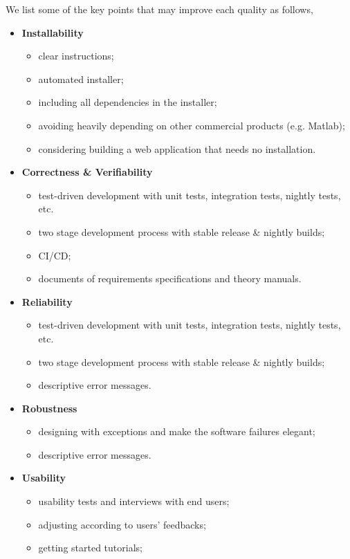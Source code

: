 We list some of the key points that may improve each quality as follows,
\begin{itemize}
\item \textbf{Installability}
\begin{itemize}
    \item clear instructions;
    \item automated installer;
    \item including all dependencies in the installer;
    \item avoiding heavily depending on other commercial products (e.g. Matlab);
    \item considering building a web application that needs no installation.
\end{itemize}
\item \textbf{Correctness \& Verifiability}
\begin{itemize}
    \item test-driven development with unit tests, integration tests, nightly tests, etc.
    \item two stage development process with stable release \& nightly builds;
    \item CI/CD;
    \item documents of requirements specifications and theory manuals.
\end{itemize}
\item \textbf{Reliability}
\begin{itemize}
    \item test-driven development with unit tests, integration tests, nightly tests, etc.
    \item two stage development process with stable release \& nightly builds;
    \item descriptive error messages.
\end{itemize}
\item \textbf{Robustness}
\begin{itemize}
    \item designing with exceptions and make the software failures elegant;
    \item descriptive error messages.
\end{itemize}
\item \textbf{Usability}
\begin{itemize}
    \item usability tests and interviews with end users;
    \item adjusting according to users’ feedbacks;
    \item getting started tutorials;

\end{itemize}
\end{itemize}
